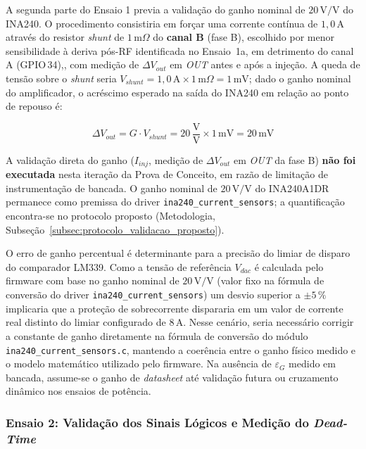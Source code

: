 A segunda parte do Ensaio 1 previa a validação do ganho nominal de $20\,\text{V/V}$ do INA240. O procedimento consistiria em forçar uma corrente contínua de $1{,}0\,\text{A}$ através do resistor \textit{shunt} de $1\,\text{m}\Omega$ do \textbf{canal B} (fase B), escolhido por menor sensibilidade à deriva pós-RF identificada no Ensaio~1a, em detrimento do canal A (GPIO\,34),, com medição de $\Delta V_{out}$ em \textit{OUT} antes e após a injeção. A queda de tensão sobre o \textit{shunt} seria $V_{shunt} = 1{,}0\,\text{A} \times 1\,\text{m}\Omega = 1\,\text{mV}$; dado o ganho nominal do amplificador, o acréscimo esperado na saída do INA240 em relação ao ponto de repouso é:

\begin{equation}
    \Delta V_{out} = G \cdot V_{shunt} = 20\,\frac{\text{V}}{\text{V}} \times 1\,\text{mV} = 20\,\text{mV}
    \label{eq:ina240_gain_check}
\end{equation}

A validação direta do ganho ($I_{inj}$, medição de $\Delta V_{out}$ em \textit{OUT} da fase B) \textbf{não foi executada} nesta iteração da Prova de Conceito, em razão de limitação de instrumentação de bancada. O ganho nominal de $20\,\text{V/V}$ do INA240A1DR permanece como premissa do driver \texttt{ina240\_current\_sensors}; a quantificação encontra-se no protocolo proposto (Metodologia, Subseção~\ref{subsec:protocolo_validacao_proposto}).

O erro de ganho percentual é determinante para a precisão do limiar de disparo do comparador LM339. Como a tensão de referência $V_{dac}$ é calculada pelo firmware com base no ganho nominal de $20\,\text{V/V}$ (valor fixo na fórmula de conversão do driver \texttt{ina240\_current\_sensors}) um desvio superior a $\pm 5\,\%$ implicaria que a proteção de sobrecorrente dispararia em um valor de corrente real distinto do limiar configurado de $8\,\text{A}$. Nesse cenário, seria necessário corrigir a constante de ganho diretamente na fórmula de conversão do módulo \texttt{ina240\_current\_sensors.c}, mantendo a coerência entre o ganho físico medido e o modelo matemático utilizado pelo firmware. Na ausência de $\varepsilon_G$ medido em bancada, assume-se o ganho de \textit{datasheet} até validação futura ou cruzamento dinâmico nos ensaios de potência.

\subsubsection{Ensaio 2: Validação dos Sinais Lógicos e Medição do \textit{Dead-Time}}

